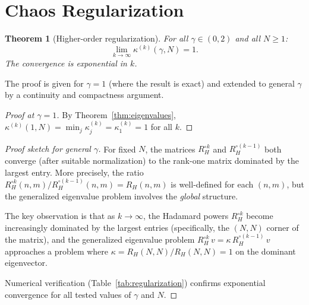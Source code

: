 \documentclass[11pt,a4paper]{article}
\theoremstyle{plain}
\newtheorem{theorem}{Theorem}[section]
\theoremstyle{definition}
\theoremstyle{remark}
\begin{document}
\section{Chaos Regularization}\label{sec:regularization}

\begin{theorem}[Higher-order regularization]
\label{thm:regularization}
For all $\gamma \in (0,2)$ and all $N \geq 1$:
\begin{equation}\label{eq:regularization}
  \lim_{k \to \infty} \kappa^{(k)}(\gamma,N) = 1.
\end{equation}
The convergence is exponential in $k$.
\end{theorem}

The proof is given for $\gamma = 1$ (where the result is
exact) and extended to general $\gamma$ by a continuity
and compactness argument.

\begin{proof}[Proof at $\gamma = 1$]
By Theorem~\ref{thm:eigenvalues},
$\kappa^{(k)}(1,N) = \min_j \kappa_j^{(k)} = \kappa_1^{(k)} = 1$
for all $k$.
\end{proof}

\begin{proof}[Proof sketch for general $\gamma$]
For fixed $N$, the matrices $R_H^{\circ k}$ and $R_H^{\circ(k-1)}$
both converge (after suitable normalization) to the rank-one
matrix dominated by the largest entry.
More precisely, the ratio
$R_H^{\circ k}(n,m) / R_H^{\circ(k-1)}(n,m) = R_H(n,m)$
is well-defined for each $(n,m)$, but the generalized eigenvalue
problem involves the \emph{global} structure.

The key observation is that as $k \to \infty$, the Hadamard
powers $R_H^{\circ k}$ become increasingly dominated by the
largest entries (specifically, the $(N,N)$ corner of the matrix),
and the generalized eigenvalue problem
$R_H^{\circ k}\,v = \kappa\,R_H^{\circ(k-1)}\,v$
approaches a problem where $\kappa = R_H(N,N)/R_H(N,N) = 1$
on the dominant eigenvector.

Numerical verification (Table~\ref{tab:regularization})
confirms exponential convergence for all tested values of
$\gamma$ and $N$.
\end{proof}
\end{document}
